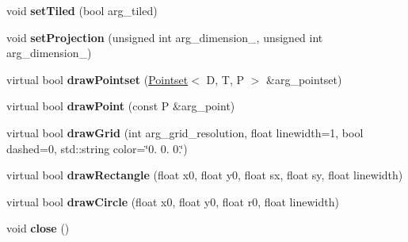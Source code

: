 \begin{DoxyCompactItemize}
\item 
\hypertarget{classutk_1_1PointsetIllustrator_ae94d47180198d9309c55ba3968a72384}{void {\bfseries set\-Tiled} (bool arg\-\_\-tiled)}\label{classutk_1_1PointsetIllustrator_ae94d47180198d9309c55ba3968a72384}

\item 
\hypertarget{classutk_1_1PointsetIllustrator_a5dfd201a1a0ed931f2e4e8d35386f2fb}{void {\bfseries set\-Projection} (unsigned int arg\-\_\-dimension\-\_, unsigned int arg\-\_\-dimension\-\_)}\label{classutk_1_1PointsetIllustrator_a5dfd201a1a0ed931f2e4e8d35386f2fb}

\item 
\hypertarget{classutk_1_1PointsetIllustrator_a65f12a0f4c47ed16eebd4c0f2d66fbfb}{virtual bool {\bfseries draw\-Pointset} (\hyperlink{classutk_1_1Pointset}{Pointset}$<$ D, T, P $>$ \&arg\-\_\-pointset)}\label{classutk_1_1PointsetIllustrator_a65f12a0f4c47ed16eebd4c0f2d66fbfb}

\item 
\hypertarget{classutk_1_1PointsetIllustrator_a5b73078e4d190e3c371fb7bb1357e2a6}{virtual bool {\bfseries draw\-Point} (const P \&arg\-\_\-point)}\label{classutk_1_1PointsetIllustrator_a5b73078e4d190e3c371fb7bb1357e2a6}

\item 
\hypertarget{classutk_1_1PointsetIllustrator_a2338f3a939b82cfba03d5f6ee317826e}{virtual bool {\bfseries draw\-Grid} (int arg\-\_\-grid\-\_\-resolution, float linewidth=1, bool dashed=0, std\-::string color=\char`\"{}0. 0. 0.\char`\"{})}\label{classutk_1_1PointsetIllustrator_a2338f3a939b82cfba03d5f6ee317826e}

\item 
\hypertarget{classutk_1_1PointsetIllustrator_af26b4440013fc754bfd98e7754f8374a}{virtual bool {\bfseries draw\-Rectangle} (float x0, float y0, float sx, float sy, float linewidth)}\label{classutk_1_1PointsetIllustrator_af26b4440013fc754bfd98e7754f8374a}

\item 
\hypertarget{classutk_1_1PointsetIllustrator_a4b621c2f56d0640e65f25c4e3e2f4c31}{virtual bool {\bfseries draw\-Circle} (float x0, float y0, float r0, float linewidth)}\label{classutk_1_1PointsetIllustrator_a4b621c2f56d0640e65f25c4e3e2f4c31}

\item 
\hypertarget{classutk_1_1PointsetIllustrator_a18db3dda9ce38834fe719aaa11bb6ff3}{void {\bfseries close} ()}\label{classutk_1_1PointsetIllustrator_a18db3dda9ce38834fe719aaa11bb6ff3}

\end{DoxyCompactItemize}


